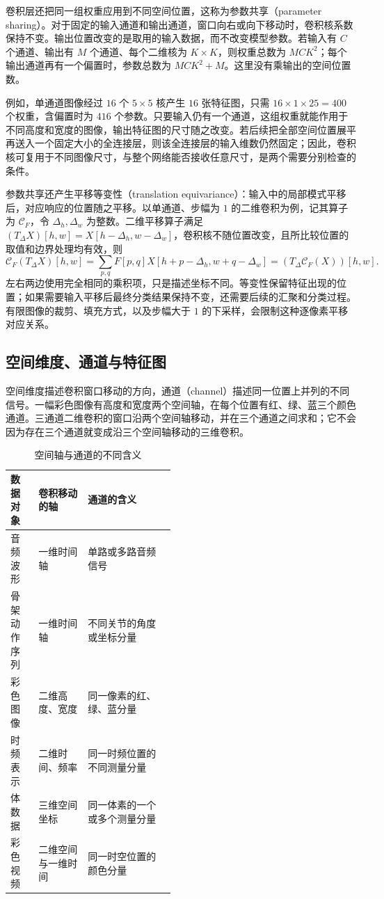 卷积层还把同一组权重应用到不同空间位置，这称为参数共享（parameter sharing）。对于固定的输入通道和输出通道，窗口向右或向下移动时，卷积核系数保持不变。输出位置改变的是取用的输入数据，而不改变模型参数。若输入有 $C$ 个通道、输出有 $M$ 个通道、每个二维核为 $K\times K$，则权重总数为 $MCK^2$；每个输出通道再有一个偏置时，参数总数为 $MCK^2+M$。这里没有乘输出的空间位置数。

例如，单通道图像经过 $16$ 个 $5\times5$ 核产生 $16$ 张特征图，只需 $16\times1\times25=400$ 个权重，含偏置时为 $416$ 个参数。只要输入仍有一个通道，这组权重就能作用于不同高度和宽度的图像，输出特征图的尺寸随之改变。若后续把全部空间位置展平再送入一个固定大小的全连接层，则该全连接层的输入维数仍然固定；因此，卷积核可复用于不同图像尺寸，与整个网络能否接收任意尺寸，是两个需要分别检查的条件。

参数共享还产生平移等变性（translation equivariance）：输入中的局部模式平移后，对应响应的位置随之平移。以单通道、步幅为 $1$ 的二维卷积为例，记其算子为 $\mathcal{C}_F$，令 $\Delta_h,\Delta_w$ 为整数。二维平移算子满足 $(T_{\Delta}X)[h,w]=X[h-\Delta_h,w-\Delta_w]$，卷积核不随位置改变，且所比较位置的取值和边界处理均有效，则
\begin{equation}
  \mathcal{C}_F(T_{\Delta}X)[h,w]
  =\sum_{p,q}F[p,q]X[h+p-\Delta_h,w+q-\Delta_w]
  =(T_{\Delta}\mathcal{C}_F(X))[h,w].
  \label{l11:eq:equivariance}
\end{equation}
左右两边使用完全相同的乘积项，只是描述坐标不同。等变性保留特征出现的位置；如果需要输入平移后最终分类结果保持不变，还需要后续的汇聚和分类过程。有限图像的裁剪、填充方式，以及步幅大于 $1$ 的下采样，会限制这种逐像素平移对应关系。

\subsection{空间维度、通道与特征图}

空间维度描述卷积窗口移动的方向，通道（channel）描述同一位置上并列的不同信号。一幅彩色图像有高度和宽度两个空间轴，在每个位置有红、绿、蓝三个颜色通道。三通道二维卷积的窗口沿两个空间轴移动，并在三个通道之间求和；它不会因为存在三个通道就变成沿三个空间轴移动的三维卷积。

\begin{table}[htbp]
\centering
\caption{空间轴与通道的不同含义}
\label{l11:tab:dimensions}
\begin{tabularx}{\linewidth}{L{0.17\linewidth}L{0.30\linewidth}X}
\toprule
数据对象 & 卷积移动的轴 & 通道的含义\\
\midrule
音频波形 & 一维时间轴 & 单路或多路音频信号\\
骨架动作序列 & 一维时间轴 & 不同关节的角度或坐标分量\\
彩色图像 & 二维高度、宽度 & 同一像素的红、绿、蓝分量\\
时频表示 & 二维时间、频率 & 同一时频位置的不同测量分量\\
体数据 & 三维空间坐标 & 同一体素的一个或多个测量分量\\
彩色视频 & 二维空间与一维时间 & 同一时空位置的颜色分量\\
\bottomrule
\end{tabularx}
\end{table}

